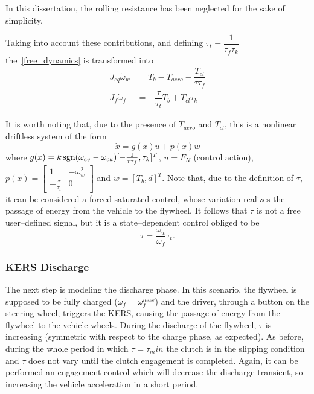 \documentclass[11pt]{article}
\begin{document}
In this dissertation, the rolling resistance has been neglected for the sake of simplicity.

Taking into account these contributions, and defining $\tau_{t} = \dfrac{1}{\tau_f \tau_k}$ the~\eqref{free_dynamics} is transformed into 
\begin{equation}
\begin{split}
J_{eq} \dot{\omega}_w & = T_b - T_{aero} - \dfrac{T_{cl}}{\tau \tau_f} \\
J_f \dot{\omega}_f & = -\dfrac{\tau}{\tau_{t}} T_b + T_{cl} \tau_k
\end{split}
\label{kers_full_dynamics_charge}
\end{equation}

It is worth noting that, due to the presence of $T_{aero}$ and $T_{cl}$, this is a nonlinear driftless system of the form
\[
\dot{x} = g(x)u + p(x)w 
\]
where $g(x) = k \, \textup{sgn} (\omega_{cv} - \omega_{ck}) [-\frac{1}{\tau \tau_f} , \tau_k]^T$, $u = F_N$ (control action), $p(x) =\left[  \begin{smallmatrix}
1 & -\omega_w^2 \\
-\frac{\tau}{\tau_t} & 0
\end{smallmatrix}\right] $
and $w = [T_b, d]^T$. Note that, due to the definition of $\tau$, it can be considered a forced saturated control, whose variation realizes the passage of energy from the vehicle to the flywheel. It follows that $\tau$ is not a free user--defined signal, but it is a state--dependent control obliged to be
\[
\tau = \dfrac{\omega_w}{\omega_f} \tau_t.
\]

\subsubsection{KERS Discharge}

The next step is modeling the discharge phase. In this scenario, the flywheel is supposed to be fully charged ($\omega_f = \omega_f^{max}$) and the driver, through a button on the steering wheel, triggers the KERS, causing the passage of energy from the flywheel to the vehicle wheels. During the discharge of the flywheel, $\tau$ is increasing (symmetric with respect to the charge phase, as expected). As before, during the whole period in which $\tau = \tau_min$ the clutch is in the slipping condition and $\tau$ does not vary until the clutch engagement is completed. Again, it can be performed an engagement control which will decrease the discharge transient, so increasing the vehicle acceleration in a short period.
\end{document}
